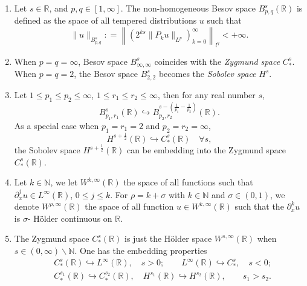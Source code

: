 \documentclass[10pt]{amsart}
\theoremstyle{remark}
\theoremstyle{definition}
\numberwithin{equation}{section}
\begin{document}
\begin{enumerate}
\item Let $s\in \mathbb{R}$, and $p,q \in [1, \infty]$.
The non-homogeneous Besov space $B^s_{p,q}(\mathbb{R})$ is defined as the space of all tempered distributions $u$ such that
\begin{equation*}
\| u\|_{B^s_{p,q}} : = \left\|(2^{ks}\|P_k u \|_{L^p})_{k=0}^\infty \right\|_{l^q} < +\infty.
\end{equation*}
\item When $p = q = \infty$, Besov space $B^s_{\infty, \infty}$ coincides with the \textit{Zygmund space} $C^s_{*}$.
When $p = q =2$, the Besov space $B^s_{2,2}$ becomes the \textit{Sobolev space} $H^s$.
\item Let $1\leq p_1 \leq p_2 \leq \infty$, $1\leq r_1 \leq r_2 \leq \infty$, then for any real number $s$,
\begin{equation*}
    B^s_{p_1, r_1}(\mathbb{R}) \hookrightarrow B^{s-(\frac{1}{p_1} - \frac{1}{p_2})}_{p_2, r_2}(\mathbb{R}).
\end{equation*}
As a special case when $p_1 = r_1 =2$ and $p_2 = r_2 = \infty$, 
\begin{equation}
 H^{s+\frac{1}{2}}(\mathbb{R}) \hookrightarrow C^s_{*}(\mathbb{R}) \quad \forall s, \label{HsCsEmbed}
\end{equation}
the Sobolev space $H^{s+\frac{1}{2}}(\mathbb{R})$ can be embedding into the Zygmund space $C^s_{*}(\mathbb{R})$.
\item Let $k\in \mathbb{N}$, we let $W^{k,\infty}(\mathbb{R})$ the space of all functions such that $\partial_x^j u \in L^\infty(\mathbb{R})$, $0\leq j \leq k$. 
For $\rho = k+ \sigma$ with $k\in \mathbb{N}$ and $\sigma \in (0,1)$, we denote $W^{\rho, \infty}(\mathbb{R})$  the
space of all function $u\in W^{k,\infty}(\mathbb{R})$ such that the $\partial_x^k u$ is $\sigma$- H\"{o}lder continuous on $\mathbb{R}$. 
\item The Zygmund space $C^s_{*}(\mathbb{R})$ is just the H\"{o}lder space $W^{s, \infty}(\mathbb{R})$ when $s\in (0,\infty)\backslash \mathbb{N}$.
One has the embedding properties
\begin{align*}
  &C_{*}^s(\mathbb{R}) \hookrightarrow L^\infty(\mathbb{R}), \quad s>0; \qquad L^\infty(\mathbb{R}) \hookrightarrow C_{*}^s, \quad s<0;\\
  &C_{*}^{s_1}(\mathbb{R})\hookrightarrow C_{*}^{s_2}(\mathbb{R}), \quad H^{s_1}(\mathbb{R})\hookrightarrow H^{s_2}(\mathbb{R}), \qquad s_1>s_2.
\end{align*}
\end{enumerate}
\end{document}
